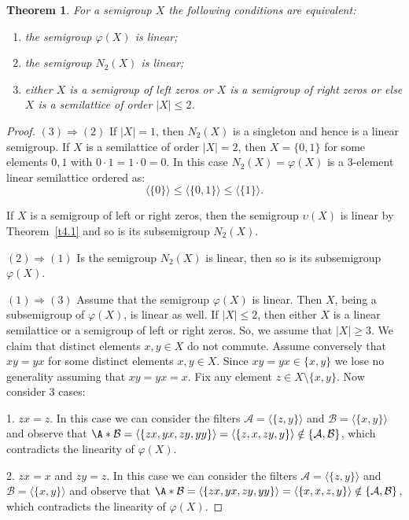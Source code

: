 \documentclass{amsart}
\newtheorem{theorem}[lem]{Theorem}
\theoremstyle{definition}
\begin{document}
\begin{theorem}\label{t4.2} For a semigroup $X$ the following conditions are equivalent:
\begin{enumerate}
\item the semigroup $\varphi(X)$ is linear;
\item the semigroup $N_2(X)$ is linear;
\item either $X$ is a semigroup of left zeros or $X$ is a semigroup of right zeros or else $X$ is a semilattice of order $|X|\le 2$.
\end{enumerate}
\end{theorem}

\begin{proof} $(3){\Rightarrow}(2)$ If $|X|=1$, then $N_2(X)$ is a singleton and hence is a
linear semigroup. If $X$ is a semilattice of order $|X|=2$, then $X=\{0,1\}$ for some elements $0,1$ with $0\cdot 1=1\cdot 0=0$. In this case $N_2(X)=\varphi(X)$ is a 3-element linear semilattice ordered as:
$${\langle} \{0\}{\rangle}\le {\langle}\{0,1\}{\rangle}\le{\langle}\{1\}{\rangle}.$$

If $X$ is a semigroup of left or right zeros, then the semigroup $\upsilon(X)$ is linear by Theorem~\ref{t4.1} and so is its subsemigroup $N_2(X)$.
\smallskip

$(2){\Rightarrow}(1)$ Is the semigroup $N_2(X)$ is linear, then so is its subsemigroup $\varphi(X)$.
\smallskip

$(1){\Rightarrow}(3)$ Assume that the semigroup $\varphi(X)$ is linear.
Then $X$, being a subsemigroup of $\varphi(X)$, is linear as well.
If $|X|\le 2$, then either $X$ is a linear semilattice or a semigroup of left or right zeros. So, we assume that $|X|\ge 3$. We claim that distinct elements $x,y\in X$ do not commute. Assume conversely that $xy=yx$ for some distinct elements $x,y\in X$. Since $xy=yx\in\{x,y\}$ we lose no generality assuming that $xy=yx=x$. Fix any element $z\in X\setminus\{x,y\}$. Now consider 3 cases:

1. $zx=z$. In this case we can consider the filters ${\mathcal A}={\langle}\{z,y\}{\rangle}$ and $\mathcal B={\langle}\{x,y\}{\rangle}$ and observe that $\A*\mathcal B={\langle}\{zx,yx,zy,yy\}{\rangle}={\langle} \{z,x,zy,y\}{\rangle}\notin\{{\mathcal A},\mathcal B\}$, which contradicts the linearity of $\varphi(X)$.

2. $zx=x$ and $zy=z$.  In this case we can consider the filters ${\mathcal A}={\langle}\{z,y\}{\rangle}$ and $\mathcal B={\langle}\{x,y\}{\rangle}$ and observe that $\A*\mathcal B={\langle}\{zx,yx,zy,yy\}{\rangle}={\langle} \{x,x,z,y\}{\rangle}\notin\{{\mathcal A},\mathcal B\}$, which contradicts the linearity of $\varphi(X)$.


\end{proof}
\end{document}
